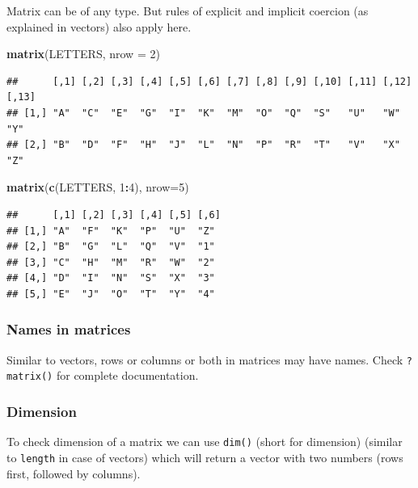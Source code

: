 \documentclass[
]{book}
\newenvironment{Shaded}{\begin{snugshade}}{\end{snugshade}}
\newcommand{\AttributeTok}[1]{\textcolor[rgb]{0.13,0.29,0.53}{#1}}
\newcommand{\DecValTok}[1]{\textcolor[rgb]{0.00,0.00,0.81}{#1}}
\newcommand{\FunctionTok}[1]{\textcolor[rgb]{0.13,0.29,0.53}{\textbf{#1}}}
\newcommand{\NormalTok}[1]{#1}
\newcommand{\SpecialCharTok}[1]{\textcolor[rgb]{0.81,0.36,0.00}{\textbf{#1}}}
\begin{document}
Matrix can be of any type. But rules of explicit and implicit coercion (as explained in vectors) also apply here.

\begin{Shaded}
\begin{Highlighting}[]
\FunctionTok{matrix}\NormalTok{(LETTERS, }\AttributeTok{nrow =} \DecValTok{2}\NormalTok{)}
\end{Highlighting}
\end{Shaded}

\begin{verbatim}
##      [,1] [,2] [,3] [,4] [,5] [,6] [,7] [,8] [,9] [,10] [,11] [,12] [,13]
## [1,] "A"  "C"  "E"  "G"  "I"  "K"  "M"  "O"  "Q"  "S"   "U"   "W"   "Y"  
## [2,] "B"  "D"  "F"  "H"  "J"  "L"  "N"  "P"  "R"  "T"   "V"   "X"   "Z"
\end{verbatim}

\begin{Shaded}
\begin{Highlighting}[]
\FunctionTok{matrix}\NormalTok{(}\FunctionTok{c}\NormalTok{(LETTERS, }\DecValTok{1}\SpecialCharTok{:}\DecValTok{4}\NormalTok{), }\AttributeTok{nrow=}\DecValTok{5}\NormalTok{)}
\end{Highlighting}
\end{Shaded}

\begin{verbatim}
##      [,1] [,2] [,3] [,4] [,5] [,6]
## [1,] "A"  "F"  "K"  "P"  "U"  "Z" 
## [2,] "B"  "G"  "L"  "Q"  "V"  "1" 
## [3,] "C"  "H"  "M"  "R"  "W"  "2" 
## [4,] "D"  "I"  "N"  "S"  "X"  "3" 
## [5,] "E"  "J"  "O"  "T"  "Y"  "4"
\end{verbatim}

\hypertarget{names-in-matrices}{%
\subsubsection*{Names in matrices}\label{names-in-matrices}}

Similar to vectors, rows or columns or both in matrices may have names. Check \texttt{?matrix()} for complete documentation.

\hypertarget{dimension}{%
\subsubsection*{Dimension}\label{dimension}}

To check dimension of a matrix we can use \texttt{dim()} (short for dimension) (similar to \texttt{length} in case of vectors) which will return a vector with two numbers (rows first, followed by columns).
\end{document}

